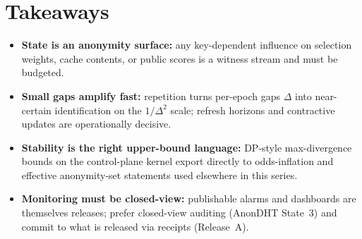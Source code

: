 \documentclass[11pt]{article}
\begin{document}
\section{Takeaways}
\begin{itemize}[leftmargin=*]
\item \textbf{State is an anonymity surface:} any key-dependent influence on selection weights, cache contents, or public scores is a witness stream and must be budgeted.
\item \textbf{Small gaps amplify fast:} repetition turns per-epoch gaps $\Delta$ into near-certain identification on the $1/\Delta^2$ scale; refresh horizons and contractive updates are operationally decisive.
\item \textbf{Stability is the right upper-bound language:} DP-style max-divergence bounds on the control-plane kernel export directly to odds-inflation and effective anonymity-set statements used elsewhere in this series.
\item \textbf{Monitoring must be closed-view:} publishable alarms and dashboards are themselves releases; prefer closed-view auditing (AnonDHT State~3) and commit to what is released via receipts (Release~A).
\end{itemize}
\end{document}

